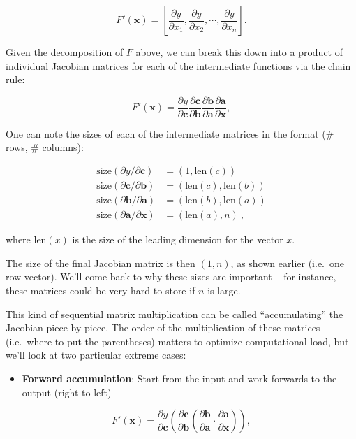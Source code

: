\documentclass[
  11pt,
  numbers=noendperiod]{book}
\providecommand{\tightlist}{%
  \setlength{\itemsep}{0pt}\setlength{\parskip}{0pt}}\usepackage{longtable,booktabs,array}
\begin{document}
\[
F'(\mathbf{x}) =  \left[ \frac{\partial y}{\partial x_1} , \frac{\partial y}{\partial x_2}, \cdots, \frac{\partial y}{\partial x_n}\right].
\]

Given the decomposition of \(F\) above, we can break this down into a
product of individual Jacobian matrices for each of the intermediate
functions via the chain rule:

\[
F'(\mathbf{x}) = \frac{\partial y}{\partial \mathbf{c}}\frac{\partial \mathbf{c}}{\partial \mathbf{b}}\frac{\partial \mathbf{b}}{\partial \mathbf{a}} \frac{\partial \mathbf{a}}{\partial \mathbf{x}},
\]

One can note the sizes of each of the intermediate matrices in the
format (\# rows, \# columns):

\begin{align*}
\mathrm{size}(\partial y / \partial \mathbf{c}) &= (1,\mathrm{len}(c)) \\
\mathrm{size}(\partial \mathbf{c} / \partial \mathbf{b} ) &= (\mathrm{len}(c), \mathrm{len}(b)) \\
\mathrm{size}(\partial \mathbf{b} / \partial \mathbf{a} ) &= (\mathrm{len}(b), \mathrm{len}(a)) \\
\mathrm{size}(\partial \mathbf{a} / \partial \mathbf{x} ) &= (\mathrm{len}(a), n)~,
\end{align*}

where $\mathrm{len}(x)$ is the size of the leading dimension for the vector $x$.

The size of the final Jacobian matrix is then \((1, n)\), as shown
earlier (i.e.~one row vector). We'll come back to why these sizes are
important -- for instance, these matrices could be very hard to store
if \(n\) is large.

This kind of sequential matrix multiplication can be called
``accumulating'' the Jacobian piece-by-piece. The order of the
multiplication of these matrices (i.e.~where to put the parentheses)
matters to optimize computational load, but we'll look at two particular
extreme cases:

\begin{itemize}
\tightlist
\item
  \textbf{Forward accumulation}: Start from the input and work forwards
  to the output (right to left)
\end{itemize}

\[
F'(\mathbf{x}) = \frac{\partial y}{\partial \mathbf{c}}\left(\frac{\partial \mathbf{c}}{\partial \mathbf{b}}\left(\frac{\partial \mathbf{b}}{\partial \mathbf{a}} \cdot \frac{\partial \mathbf{a}}{\partial \mathbf{x}}\right)\right),
\]
\end{document}
